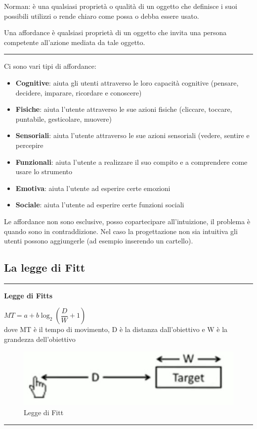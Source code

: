 \documentclass[11pt,a4paper]{book}
\begin{document}
Norman: è una qualsiasi proprietà o qualità di un oggetto che definisce i suoi possibili utilizzi o rende chiaro come possa o debba essere usato.

Una affordance è qualsiasi proprietà di un oggetto che invita una persona competente all'azione mediata da tale oggetto.

\noindent\rule{\textwidth}{1pt}

Ci sono vari tipi di affordance:
\begin{itemize}
	\item \textbf{Cognitive}: aiuta gli utenti attraverso le loro capacità cognitive (pensare, decidere, imparare, ricordare e conoscere)
	\item \textbf{Fisiche}: aiuta l'utente attraverso le sue azioni fisiche (cliccare, toccare, puntabile, gesticolare, muovere)
	\item \textbf{Sensoriali}: aiuta l'utente attraverso le sue azioni sensoriali (vedere, sentire e percepire
	\item \textbf{Funzionali}: aiuta l'utente a realizzare il suo compito e a comprendere come usare lo strumento
	\item \textbf{Emotiva}: aiuta l'utente ad esperire certe emozioni
	\item \textbf{Sociale}: aiuta l'utente ad esperire certe funzioni sociali
\end{itemize}

Le affordance non sono esclusive, posso copartecipare all'intuizione, il problema è quando sono in contraddizione. Nel caso la progettazione non sia intuitiva gli utenti possono aggiungerle (ad esempio inserendo un cartello).

\subsection{La legge di Fitt}
\noindent\rule{\textwidth}{1pt}
\begin{center}
	\textbf{Legge di Fitts}
	
	$MT = a + b\log_{2}(\dfrac{D}{W} + 1)$ \\dove MT è il tempo di movimento, D è la distanza dall'obiettivo e W è la grandezza dell'obiettivo
\end{center}
\begin{figure}[h!]
	\begin{center}
		\includegraphics[scale=0.6]{img/004.jpg}
		\caption{Legge di Fitt}
		\label{fig: 004}
	\end{center}
\end{figure}
\noindent\rule{\textwidth}{1pt}
\end{document}
